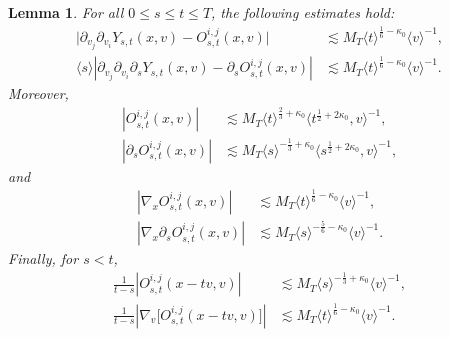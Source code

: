 \documentclass[reqno,11pt]{amsart}
\numberwithin{equation}{section}
\newtheorem{lemma}[theorem]{Lemma}
\begin{document}
	\begin{lemma}\label{lem:second-v-expansion}
		For all $0\le s\le t\le T$, the following estimates hold:
		\begin{align}
			\Big|\partial_{v_j}\partial_{v_i}Y_{s,t}(x,v)-O_{s,t}^{i,j}(x,v)\Big|&\lesssim M_T
			\langle t\rangle^{\frac16-\kappa_0}\langle v\rangle^{-1},
			\label{q27}\\
			\langle s\rangle\left|
			\partial_{v_j}\partial_{v_i}\partial_sY_{s,t}(x,v)-\partial_sO_{s,t}^{i,j}(x,v)
			\right|&\lesssim M_T\langle t\rangle^{\frac16-\kappa_0}
			\langle v\rangle^{-1}.\label{q28}
		\end{align}
		Moreover,
		\begin{align}
			|O_{s,t}^{i,j}(x,v)|&\lesssim M_T
			\langle t\rangle^{\frac23+\kappa_0}
			\langle t^{\frac12+2\kappa_0},v\rangle^{-1},
			\label{q62a}\\
			|\partial_sO_{s,t}^{i,j}(x,v)|&\lesssim M_T
			\langle s\rangle^{-\frac13+\kappa_0}\langle s^{\frac12+2\kappa_0},v\rangle^{-1},
			\label{q62b}
		\end{align}
		and
		\begin{align}
			|\nabla_{x}O_{s,t}^{i,j}(x,v)|
			&\lesssim
			M_T
			\langle t\rangle^{\frac16-\kappa_0}
			\langle v\rangle^{-1},
			\label{q62c}
			\\
			|\nabla_{x}\partial_sO_{s,t}^{i,j}(x,v)|
			&\lesssim
			M_T
			\langle s\rangle^{-\frac56-\kappa_0}\langle v\rangle^{-1}.
			\label{q62d}
		\end{align}
		Finally, for $s<t$,
		\begin{align}
			\frac{1}{t-s}\left|O_{s,t}^{i,j}(x-tv,v)\right|&\lesssim M_T\langle s\rangle^{-\frac13+\kappa_0}\langle v\rangle^{-1},\label{q29}\\
			\frac{1}{t-s}\left|\nabla_v\big[O_{s,t}^{i,j}(x-tv,v)\big]\right|&\lesssim
			M_T\langle t\rangle^{\frac16-\kappa_0}\langle v\rangle^{-1}.\label{q30}
		\end{align}
	\end{lemma}
	
\end{document}
